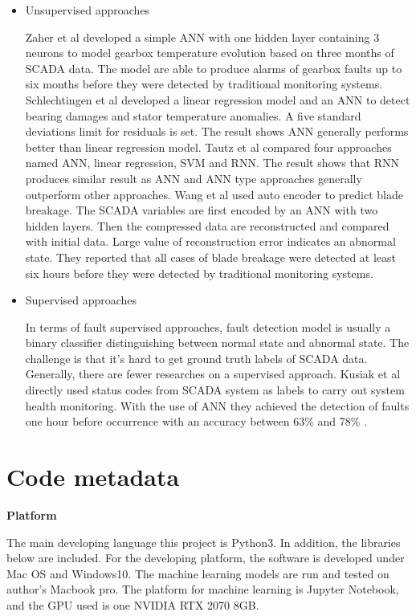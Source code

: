 \begin{itemize}

\item Unsupervised approaches

Zaher et al \cite{zaher2009online} developed a simple ANN with one hidden layer containing 3 neurons to model gearbox temperature evolution based on three months of SCADA data. The model are able to produce alarms of gearbox faults up to six months before they were detected by traditional monitoring systems. Schlechtingen et al \cite{schlechtingen2011comparative} developed a linear regression model and an ANN to detect bearing damages and stator temperature anomalies. A five standard deviations limit for residuals is set. The result shows ANN generally performs better than linear regression model. Tautz et al compared four approaches named ANN, linear regression, SVM and RNN. The result shows that RNN produces similar result as ANN and ANN type approaches generally outperform other approaches. Wang et al \cite{wang2016wind} used auto encoder to predict blade breakage. The SCADA variables are first encoded by an ANN with two hidden layers. Then the compressed data are reconstructed and compared with initial data. Large value of reconstruction error indicates an abnormal state. They reported that all cases of blade breakage were detected at least six hours before they were detected by traditional monitoring systems.

\item Supervised approaches

In terms of fault supervised approaches, fault detection model is usually a binary classifier distinguishing between normal state and abnormal state. The challenge is that it's hard to get ground truth labels of SCADA data. Generally, there are fewer researches on a supervised approach. Kusiak et al directly used status codes from SCADA system as labels to carry out system health monitoring. With the use of ANN they achieved the detection of faults one hour before occurrence with an accuracy between 63\% and 78\% \cite{kusiak2011prediction}.

\end{itemize}

\section{Code metadata}
\textbf{Platform}

The main developing language this project is Python3. In addition, the libraries below are included. For the developing platform, the software is developed under Mac OS and Windows10. The machine learning models are run and tested on author's Macbook pro. The platform for machine learning is Jupyter Notebook, and the GPU used is one NVIDIA RTX 2070 8GB.


